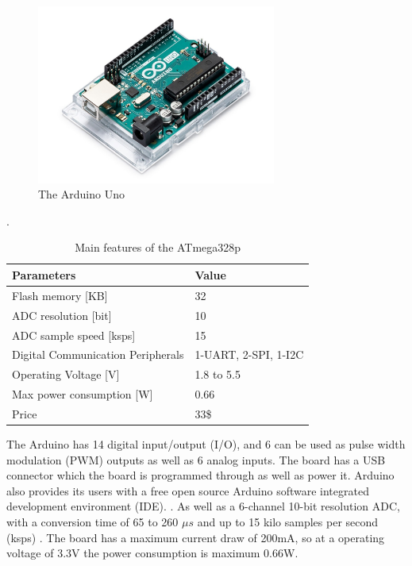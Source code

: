 \begin{figure}[h]
    \centering
    \includegraphics[width=0.70\textwidth]{graphics/ArduinoUNo.jpg}
    \caption{The Arduino Uno \cite{noauthor_arduino_nodate}}
    \label{fig:Arduino}
\end{figure}

\begin{table}[h]\caption{Main features of the ATmega328p \cite{noauthor_atmega328p_nodate}}.\label{Tab:ATmega328p}
\centering
    \begin{tabular}{|l|l|}
    \hline
        Parameters                        & Value                \\ \hline
        Flash memory [KB]                 & 32                      \\ \hline
        ADC resolution [bit]              & 10                   \\ \hline
        ADC sample speed [ksps]           & 15                     \\ \hline
        Digital Communication Peripherals & 1-UART, 2-SPI, 1-I2C \\ \hline
        Operating Voltage [V]             & 1.8 to 5.5           \\ \hline
        Max power consumption [W]         & 0.66               \\ \hline
        Price                             & 33\$                \\ \hline
    \end{tabular}
\end{table}


The Arduino has 14 digital input/output (I/O), and 6 can be used as pulse width modulation (PWM) outputs as well as 6 analog inputs.
The board has a USB connector which the board is programmed through as well as power it.
Arduino also provides its users with a free open source Arduino software integrated development environment (IDE).  \cite{noauthor_arduino_nodate}.
As well as a 6-channel 10-bit resolution ADC, with a conversion time of 65 to 260 $\mu s$ and up to 15 kilo samples per second (ksps) .
The board has a maximum current draw of 200mA, so at a operating voltage of 3.3V the power consumption is maximum 0.66W\cite{noauthor_atmega328p_nodate}.

